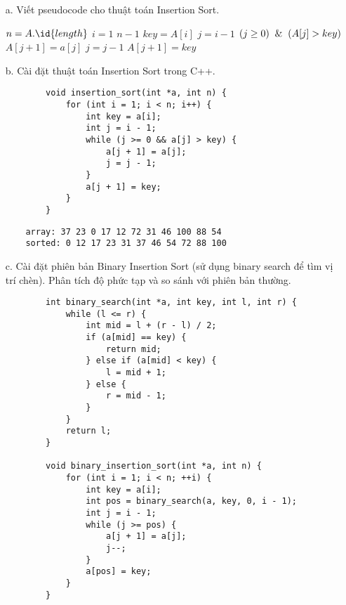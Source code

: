 \documentclass[12pt,a4paper]{article}
\begin{document}
\begin{enumerate}
    \item[a.] Viết pseudocode cho thuật toán Insertion Sort.
    \begin{codebox}
            \li $n = A.\id{length}$
            \li \For $i = 1$ \To $n - 1$
                \Do
                    \li $key = A[i]$
                    \li $j = i - 1$
                    \li \While $(j \ge 0) \And (A[j] > key)$
                        \Do
                            \li $A[j + 1] = a[j]$
                            \li $j = j - 1$
                        \End
                    \li $A[j + 1] = key$
                \End
    \end{codebox}
    \item[b.] Cài đặt thuật toán Insertion Sort trong C++.
    \begin{verbatim}
        void insertion_sort(int *a, int n) {
            for (int i = 1; i < n; i++) {
                int key = a[i];
                int j = i - 1;
                while (j >= 0 && a[j] > key) {
                    a[j + 1] = a[j];
                    j = j - 1;
                }
                a[j + 1] = key;
            }
        }
    \end{verbatim}

    \begin{verbatim}
    array: 37 23 0 17 12 72 31 46 100 88 54
    sorted: 0 12 17 23 31 37 46 54 72 88 100
    \end{verbatim}

    \newpage
    \item[c.] Cài đặt phiên bản Binary Insertion Sort 
              (sử dụng binary search để tìm vị trí chèn).
              Phân tích độ phức tạp và so sánh với phiên bản thường.
    \begin{verbatim}
        int binary_search(int *a, int key, int l, int r) {
            while (l <= r) {
                int mid = l + (r - l) / 2;
                if (a[mid] == key) {
                    return mid;
                } else if (a[mid] < key) {
                    l = mid + 1;
                } else {
                    r = mid - 1;
                }
            }
            return l;
        }

        void binary_insertion_sort(int *a, int n) {
            for (int i = 1; i < n; ++i) {
                int key = a[i]; 
                int pos = binary_search(a, key, 0, i - 1);
                int j = i - 1;
                while (j >= pos) {
                    a[j + 1] = a[j];
                    j--;
                }
                a[pos] = key;
            }
        }
    \end{verbatim}


\end{enumerate}
\end{document}
